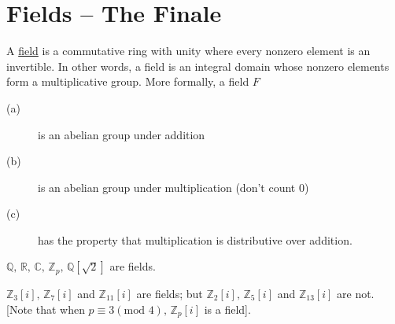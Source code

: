 \documentclass[12pt]{book}
\theoremstyle{definition}
\def\Z{\mathbb{Z}}
\begin{document}
\section{Fields -- The Finale}

A \underline{field} is a commutative ring with unity where every nonzero element is an invertible.  In other words, a field is an integral domain whose nonzero elements form a multiplicative group.  More formally, a field $F$
\begin{description}
\item[\quad(a)] is an abelian group under addition
\item[\quad(b)] is an abelian group under multiplication (don't count 0)
\item[\quad(c)] has the property that multiplication is distributive over addition.
\end{description}

\begin{tcexample}{}{}
$\mathbb{Q},\,\mathbb{R},\,\mathbb{C},\,\Z_p,\, \mathbb{Q}[\sqrt2]$ are fields.
\end{tcexample}

\begin{tcexample}{}{}
$\Z_3[i],\, \Z_7[i]$ and $\Z_{11}[i]$ are fields; but $\Z_2[i],\, \Z_5[i]$ and $\Z_{13}[i]$ are not. [Note that when $p\equiv3(\text{mod }4),\, \Z_p[i]$ is a field].
\end{tcexample}
\end{document}
